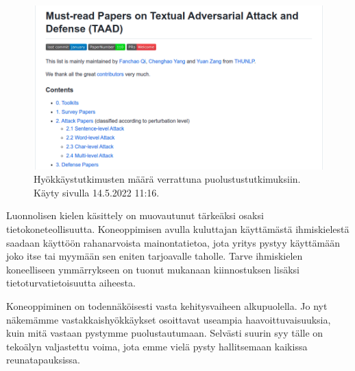 \begin{figure}[ht]
  \includegraphics[scale=0.4]{figures/github-papers.png}
  \caption{Hyökkäystutkimusten määrä verrattuna puolustustutkimuksiin. Käyty sivulla 14.5.2022 11:16.}
\end{figure}

Luonnolisen kielen käsittely on muovautunut tärkeäksi osaksi tietokoneteollisuutta. Koneoppimisen avulla kuluttajan käyttämästä ihmiskielestä saadaan käyttöön rahanarvoista mainontatietoa, jota yritys pystyy käyttämään joko itse tai myymään sen eniten tarjoavalle taholle. Tarve ihmiskielen koneelliseen ymmärrykseen on tuonut mukanaan kiinnostuksen lisäksi tietoturvatietoisuutta aiheesta.


Koneoppiminen on todennäköisesti vasta kehitysvaiheen alkupuolella. Jo nyt näkemämme vastakkaishyökkäykset osoittavat useampia haavoittuvaisuuksia, kuin mitä vastaan pystymme puolustautumaan. Selvästi suurin syy tälle on tekoälyn valjastettu voima, jota emme vielä pysty hallitsemaan kaikissa reunatapauksissa.